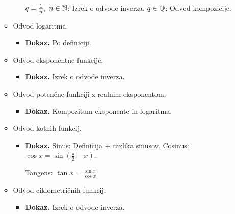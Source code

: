 \begin{enumerate}
\begin{itemize}
\begin{itemize}
            $q = \frac{1}{n}, \ n \in \mathbb{N}$: Izrek o odvode inverza.
            $q \in \mathbb{Q}$: Odvod kompozicije.
        \end{itemize}
        \item Odvod logaritma.
        \begin{itemize}
            \item \colorbox{green!30}{\textbf{Dokaz.}} Po definiciji.
        \end{itemize}
        \item Odvod eksponentne funkcije.
        \begin{itemize}
            \item \colorbox{green!30}{\textbf{Dokaz.}} Izrek o odvode inverza.
        \end{itemize}
        \item Odvod potenčne funkciji z realnim eksponentom.
        \begin{itemize}
            \item \colorbox{green!30}{\textbf{Dokaz.}} Kompozitum eksponente in logaritma.
        \end{itemize}
        \item Odvod kotnih funkcij.
        \begin{itemize}
            \item \colorbox{green!30}{\textbf{Dokaz.}} Sinus: Definicija + razlika sinusov.            
            Cosinus: $\cos x = \sin (\frac{\pi}{2} - x)$.

            Tangens: $\tan x = \frac{\sin x}{\cos x}$
        \end{itemize}
        \item Odvod ciklometričnih funkcij.
        \begin{itemize}
            \item \colorbox{green!30}{\textbf{Dokaz.}} Izrek o odvode inverza.
        \end{itemize}
    \end{itemize}


\end{enumerate}
